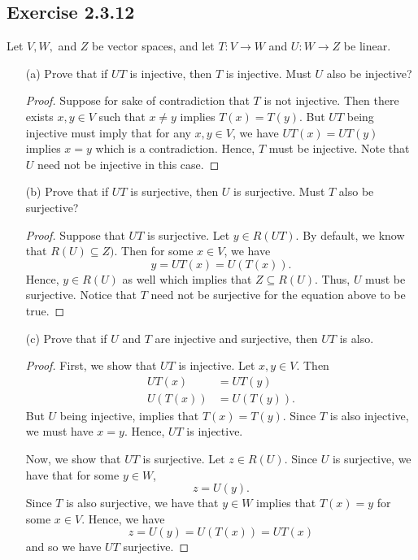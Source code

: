 \subsection*{Exercise 2.3.12} Let \( V, W,  \) and \( Z  \) be vector spaces, and let \( T:  V \to W  \) and \( U: W \to Z  \) be linear.
\begin{enumerate}
    \item[(a)] Prove that if \( UT \) is injective, then \( T  \) is injective. Must \( U  \) also be injective?
        \begin{proof}
        Suppose for sake of contradiction that \( T \) is not injective. Then there exists \( x,y \in V  \) such that \( x \neq y  \) implies \( T(x) = T(y) \). But \( UT  \) being injective must imply that for any \( x,y \in V  \), we have \(  UT(x) = UT(y)  \) implies \( x = y  \) which is a contradiction. Hence, \( T  \) must be injective. Note that \( U  \) need not be injective in this case.
        \end{proof}
    \item[(b)] Prove that if \( UT  \) is surjective, then \( U  \) is surjective. Must \( T  \) also be surjective? 
        \begin{proof}
        Suppose that \( UT  \) is surjective. Let \( y \in R(UT) \). By default, we know that \( R(U) \subseteq Z) \). Then for some \( x \in V  \), we have 
        \[  y = UT(x) = U(T(x)). \]
      Hence, \( y \in R(U) \) as well which implies that \( Z \subseteq R(U) \). Thus, \( U  \) must be surjective. Notice that \( T  \) need not be surjective for the equation above to be true.
        \end{proof}
    \item[(c)] Prove that if \( U  \) and \( T  \) are injective and surjective, then \( UT  \) is also.
        \begin{proof}
            First, we show that \( UT  \) is injective. Let \( x,y \in V  \). Then
            \begin{align*}
                UT(x) &= UT(y) \\
                U(T(x)) &= U(T(y)).
            \end{align*}
            But \( U  \) being injective, implies that \( T(x) = T(y)  \). Since \( T  \) is also injective, we must have \( x = y  \). Hence, \( UT  \) is injective. 

            Now, we show that \( UT  \) is surjective. Let \( z \in R(U)  \). Since \( U  \) is surjective, we have that for some \( y \in W   \), 
            \[  z = U(y). \]
            Since \( T  \) is also surjective, we have that \( y \in W  \) implies that \( T(x) = y  \) for some \( x \in V  \). Hence, we have
            \[  z = U(y) = U(T(x)) = UT(x) \]
            and so we have \( UT  \) surjective.
            
        \end{proof}
\end{enumerate}

